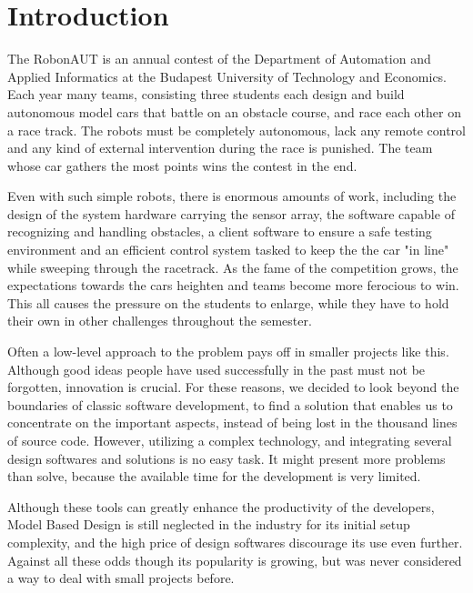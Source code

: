 \section{Introduction}
\label{sec:Introduction}


The RobonAUT is an annual contest of the Department of Automation and Applied Informatics at the Budapest University of Technology and Economics. Each year many teams, consisting three students each design and build autonomous model cars that battle on an obstacle course, and race each other on a race track. The robots must be completely autonomous, lack any remote control and any kind of external intervention during the race is punished. The team whose car gathers the most points wins the contest in the end\cite{rules}.


Even with such simple robots, there is enormous amounts of work, including the design of the system hardware carrying the sensor array, the software capable of recognizing and handling obstacles, a client software to ensure a safe testing environment and an efficient control system tasked to keep the the car "in line" while sweeping through the racetrack. As the fame of the competition grows, the expectations towards the cars heighten and teams become more ferocious to win. This all causes the pressure on the students to enlarge, while they have to hold their own in other challenges throughout the semester.


Often a low-level approach to the problem pays off in smaller projects like this. Although good ideas people have used successfully in the past must not be forgotten, innovation is crucial. For these reasons, we decided to look beyond the boundaries of classic software development, to find a solution that enables us to concentrate on the important aspects, instead of being lost in the thousand lines of source code. However, utilizing a complex technology, and integrating several design softwares and solutions is no easy task. It might present more problems than solve, because the available time for the development is very limited.


Although these tools can greatly enhance the productivity of the developers, Model Based Design is still neglected in the industry for its initial setup complexity, and the high price of design softwares discourage its use even further. Against all these odds though its popularity is growing, but was never considered a way to deal with small projects before.

